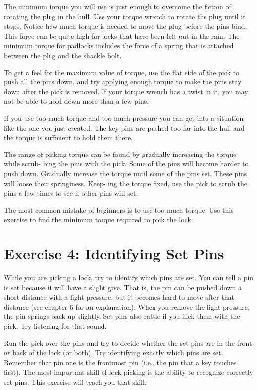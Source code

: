 The minimum torque you will use is just enough to overcome the fiction of rotating the 
plug in the hull. Use your torque wrench to rotate the plug until it stops. Notice how much 
torque is needed to move the plug before the pins bind. This force can be quite high for 
locks that have been left out in the rain. The minimum torque for padlocks includes the 
force of a spring that is attached between the plug and the shackle bolt. 

To get a feel for the maximum value of torque, use the flat side of the pick to push all 
the pins down, and try applying enough torque to make the pins stay down after the pick is 
removed. If your torque wrench has a twist in it, you may not be able to hold down more 
than a few pins. 

If you use too much torque and too much pressure you can get into a situation like the 
one you just created. The key pins are pushed too far into the hull and the torque is sufficient 
to hold them there. 

The range of picking torque can be found by gradually increasing the torque while scrub- 
bing the pins with the pick. Some of the pins will become harder to push down. Gradually 
increase the torque until some of the pins set. These pins will loose their springiness. Keep- 
ing the torque fixed, use the pick to scrub the pins a few times to see if other pins will 
set. 

The most common mistake of beginners is to use too much torque. Use this exercise to 
find the minimum torque required to pick the lock.

\section{Exercise 4: Identifying Set Pins}
While you are picking a lock, try to identify which pins are set. You can tell a pin is set 
because it will have a slight give. That is, the pin can be pushed down a short distance 
with a light pressure, but it becomes hard to move after that distance (see chapter 6 for an 
explanation). When you remove the light pressure, the pin springs back up slightly. Set pins 
also rattle if you flick them with the pick. Try listening for that sound. 

Run the pick over the pins and try to decide whether the set pins are in the front or back 
of the lock (or both). Try identifying exactly which pins are set. Remember that pin one is 
the frontmost pin (i.e., the pin that a key touches first). The most important skill of lock 
picking is the ability to recognize correctly set pins. This exercise will teach you that skill. 

